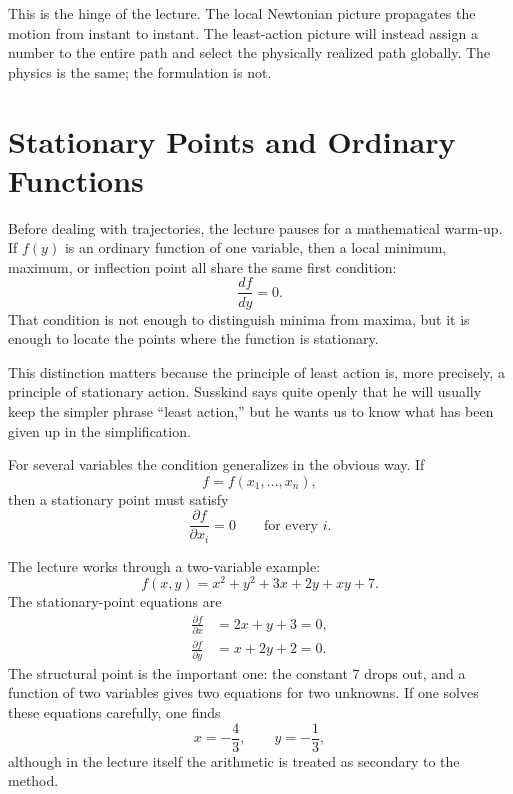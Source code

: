 This is the hinge of the lecture. The local Newtonian picture propagates the motion from instant to instant. The least-action picture will instead assign a number to the entire path and select the physically realized path globally. The physics is the same; the formulation is not.

\section{Stationary Points and Ordinary Functions}

Before dealing with trajectories, the lecture pauses for a mathematical warm-up. If \(f(y)\) is an ordinary function of one variable, then a local minimum, maximum, or inflection point all share the same first condition:
\begin{equation}
\frac{df}{dy}=0.
\end{equation}
That condition is not enough to distinguish minima from maxima, but it is enough to locate the points where the function is stationary.

This distinction matters because the principle of least action is, more precisely, a principle of stationary action. Susskind says quite openly that he will usually keep the simpler phrase ``least action,'' but he wants us to know what has been given up in the simplification.

For several variables the condition generalizes in the obvious way. If
\begin{equation}
f=f(x_1,\dots,x_n),
\end{equation}
then a stationary point must satisfy
\begin{equation}
\frac{\partial f}{\partial x_i}=0
\qquad \text{for every } i.
\end{equation}

The lecture works through a two-variable example:
\begin{equation}
f(x,y)=x^2+y^2+3x+2y+xy+7.
\end{equation}
The stationary-point equations are
\begin{align}
\frac{\partial f}{\partial x} &= 2x+y+3=0, \\
\frac{\partial f}{\partial y} &= x+2y+2=0.
\end{align}
The structural point is the important one: the constant \(7\) drops out, and a function of two variables gives two equations for two unknowns. If one solves these equations carefully, one finds
\begin{equation}
x=-\frac43,\qquad y=-\frac13,
\end{equation}
although in the lecture itself the arithmetic is treated as secondary to the method.

